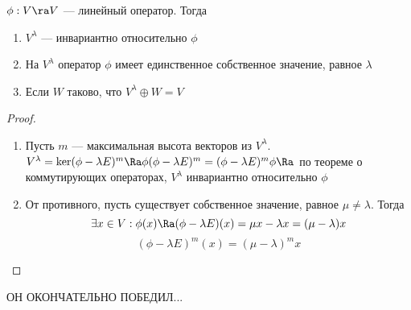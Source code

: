 \begin{theorem}
    \(\phi: V \ra V\) --- линейный оператор. Тогда
    \begin{enumerate}
        \item \(V^\lambda\) --- инвариантно относительно \(\phi\)
        \item На \(V^\lambda\) оператор \(\phi\) имеет единственное собственное значение, равное \(\lambda\)
        \item Если \(W\) таково, что \(V^\lambda \oplus W = V\)
    \end{enumerate}
\end{theorem}
\begin{proof}\indent
    \begin{enumerate}
        \item Пусть \(m\) --- максимальная высота векторов из \(V^\lambda\). \(V^\lambda = \ker (\phi - \lambda E)^m \Ra \phi(\phi - \lambda E)^m = (\phi - \lambda E)^m\phi \Ra\) по теореме о коммутирующих операторах, \(V^\lambda\) инвариантно относительно \(\phi\)
        \item От противного, пусть существует собственное значение, равное \(\mu \ne \lambda\). Тогда 
        \[\exists x \in V: \phi(x) \Ra (\phi - \lambda E)(x) = \mu x - \lambda x = (\mu - \lambda)x\]
        \[(\phi - \lambda E)^m(x) = (\mu - \lambda)^mx\]
    \end{enumerate}
\end{proof}

ОН ОКОНЧАТЕЛЬНО ПОБЕДИЛ...